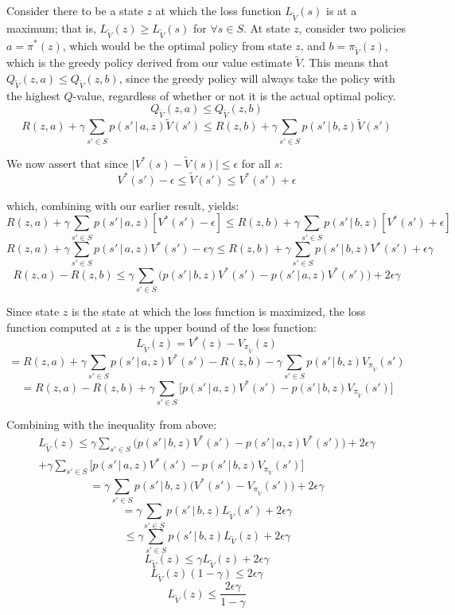 \documentclass[11pt]{scrartcl}
\begin{document}
Consider there to be a state $z$ at which the loss function $L_{\tilde{V}}(s)$ is at a maximum; that is, $L_{\tilde{V}}(z) \geq L_{\tilde{V}}(s)$ for $\forall{s} \in S$. At state $z$, consider two policies $a = \pi^{*}(z)$, which would be the optimal policy from state $z$, and $b = \pi_{\tilde{V}}(z)$, which is the greedy policy derived from our value estimate $\tilde{V}$. This means that $Q_{\tilde{V}}(z,a) \leq Q_{\tilde{V}}(z,b)$, since the greedy policy will always take the policy with the highest $Q$-value, regardless of whether or not it is the actual optimal policy.
$$Q_{\tilde{V}}(z,a) \leq Q_{\tilde{V}}(z,b)$$
$$R(z, a) + \gamma \sum_{s' \in S} p(s' \, | \, a,z)\tilde{V}(s') \leq R(z, b) + \gamma \sum_{s' \in S} p(s' \, | \, b,z)\tilde{V}(s')$$

We now assert that since $\vert V^{*}(s) - \tilde{V}(s) \vert \leq \epsilon$ for all $s$:
$$V^{*}(s') - \epsilon \leq \tilde{V}(s') \leq V^{*}(s') + \epsilon$$

which, combining with our earlier result, yields:
$$R(z, a) + \gamma \sum_{s' \in S} p(s' \, | \, a,z)[V^{*}(s') - \epsilon] \leq R(z, b) + \gamma \sum_{s' \in S} p(s' \, | \, b,z)[V^{*}(s') + \epsilon]$$
$$R(z, a) + \gamma \sum_{s' \in S} p(s' \, | \, a,z)V^{*}(s') - \epsilon \gamma \leq R(z, b) + \gamma \sum_{s' \in S} p(s' \, | \, b,z)V^{*}(s') + \epsilon \gamma$$
$$R(z, a) - R(z, b) \leq \gamma \sum_{s' \in S} \bigg( p(s' \, | \, b, z) V^{*}(s') - p(s' \, | \, a, z) V^{*}(s') \bigg) + 2 \epsilon \gamma$$

Since state $z$ is the state at which the loss function is maximized, the loss function computed at $z$ is the upper bound of the loss function:
$$L_{\tilde{V}}(z) = V^{*}(z) - V_{\pi_{\tilde{V}}} (z)$$
$$= R(z,a) + \gamma \sum_{s' \in S} p(s' \, | \, a,z) V^{*}(s') - R(z,b) - \gamma \sum_{s' \in S} p(s' \, | \, b,z) V_{\pi_{\tilde{V}}}(s')$$
$$= R(z,a) - R(z,b) + \gamma \sum_{s' \in S} \bigg[ p(s' \, | \, a,z) V^{*}(s') - p(s' \, | \, b,z) V_{\pi_{\tilde{V}}}(s') \bigg]$$

Combining with the inequality from above:
\begin{multline*}
L_{\tilde{V}}(z) \leq \gamma \sum_{s' \in S} \bigg( p(s' \, | \, b, z) V^{*}(s') - p(s' \, | \, a, z) V^{*}(s') \bigg) + 2 \epsilon \gamma \\
+ \gamma \sum_{s' \in S} \bigg[ p(s' \, | \, a,z) V^{*}(s') - p(s' \, | \, b,z) V_{\pi_{\tilde{V}}}(s') \bigg]
\end{multline*}
$$= \gamma \sum_{s' \in S} p(s' \, | \, b,z) \bigg( V^{*}(s') - V_{\pi_{\tilde{V}}}(s') \bigg) + 2 \epsilon \gamma$$
$$= \gamma \sum_{s' \in S} p(s' \, | \, b,z) L_{\tilde{V}}(s') + 2 \epsilon \gamma$$
$$\leq \gamma \sum_{s' \in S} p(s' \, | \, b,z) L_{\tilde{V}}(z) + 2 \epsilon \gamma$$
$$L_{\tilde{V}}(z) \leq \gamma L_{\tilde{V}}(z) + 2 \epsilon \gamma$$
$$L_{\tilde{V}}(z) (1 - \gamma) \leq 2 \epsilon \gamma$$
$$\boxed{L_{\tilde{V}}(z) \leq \frac{2 \epsilon \gamma}{1 - \gamma}}$$
\end{document}
